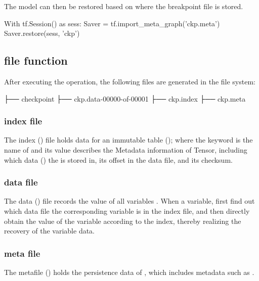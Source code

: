 \begin{content}
The model can then be restored based on where the breakpoint file is stored.

\begin{leftbar}
\begin{python}
With tf.Session() as sess:
  Saver = tf.import_meta_graph('ckp.meta')
  Saver.restore(sess, 'ckp')
\end{python}
\end{leftbar}

\subsection{file function}

After executing the  operation, the following files are generated in the file system:

\begin{leftbar}
\begin{python}
├── checkpoint
├── ckp.data-00000-of-00001
├── ckp.index
├── ckp.meta
\end{python}
\end{leftbar}

\subsubsection{index file}

The index () file holds data for an immutable table (); where the keyword is the name of  and its value describes the \ascii Metadata information of {Tensor}, including which data () the  is stored in, its offset in the data file, and its checksum.

\subsubsection{data file}

The data () file records the value of all variables . When  a variable, first find out which data file the corresponding variable is in the index file, and then directly obtain the value of the variable according to the index, thereby realizing the recovery of the variable data.

\subsubsection{meta file}

The metafile () holds the persistence data of , which includes metadata such as .


\end{content}
